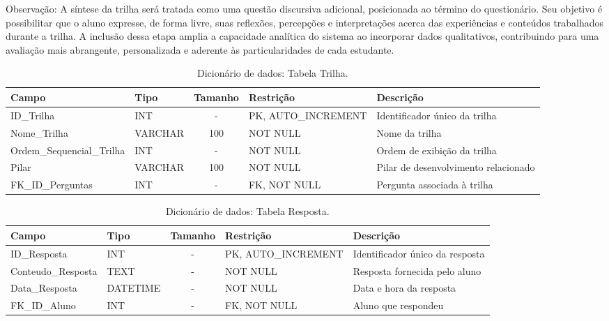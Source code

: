 Observação: A síntese da trilha será tratada como uma questão discursiva adicional, posicionada ao término do questionário. Seu objetivo é possibilitar que o aluno expresse, de forma livre, suas reflexões, percepções e interpretações acerca das experiências e conteúdos trabalhados durante a trilha. A inclusão dessa etapa amplia a capacidade analítica do sistema ao incorporar dados qualitativos, contribuindo para uma avaliação mais abrangente, personalizada e aderente às particularidades de cada estudante.

\begin{table}[H]
    \centering
    \ABNTEXfontereduzida
    \caption[Dicionário de Dados - Tabela Trilha]{Dicionário de dados: Tabela Trilha.}
    \label{tab-tb-trilha}
    \begin{tabular}{p{3.5cm}|p{2cm}|c|p{3.5cm}|p{4cm}}
    \textbf{Campo} & \textbf{Tipo} & \textbf{Tamanho} & \textbf{Restrição} & \textbf{Descrição} \\
    \hline
    ID\_Trilha & INT & - & PK, AUTO\_INCREMENT & Identificador único da trilha \\
    \hline
    Nome\_Trilha & VARCHAR & 100 & NOT NULL & Nome da trilha \\
    \hline
    Ordem\_Sequencial\_Trilha & INT & - & NOT NULL & Ordem de exibição da trilha \\
    \hline
    Pilar & VARCHAR & 100 & NOT NULL & Pilar de desenvolvimento relacionado \\
    \hline
    FK\_ID\_Perguntas & INT & - & FK, NOT NULL & Pergunta associada à trilha \\
    \end{tabular}
\end{table}

\begin{table}[H]
    \centering
    \ABNTEXfontereduzida
    \caption[Dicionário de Dados - Tabela Resposta]{Dicionário de dados: Tabela Resposta.}
    \label{tab-tb-resposta}
    \begin{tabular}{p{3.5cm}|p{2cm}|c|p{3.5cm}|p{4cm}}
    \textbf{Campo} & \textbf{Tipo} & \textbf{Tamanho} & \textbf{Restrição} & \textbf{Descrição} \\
    \hline
    ID\_Resposta & INT & - & PK, AUTO\_INCREMENT & Identificador único da resposta \\
    \hline
    Conteudo\_Resposta & TEXT & - & NOT NULL & Resposta fornecida pelo aluno \\
    \hline
    Data\_Resposta & DATETIME & - & NOT NULL & Data e hora da resposta \\
    \hline
    FK\_ID\_Aluno & INT & - & FK, NOT NULL & Aluno que respondeu \\
    \end{tabular}
\end{table}

